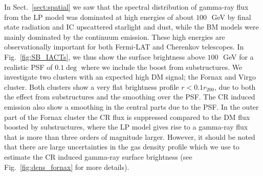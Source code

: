\documentclass[10pt,aps,pra,reprint,amsmath,amsfonts,amssymb,showpacs,nofootinbib,floatfix]{revtex4-1}
\newcommand{\rvir}{r_{200}}
\begin{document}
In Sect.~\ref{sect:spatial} we saw that the spectral distribution of
gamma-ray flux from the LP model was dominated at high energies of
about $100\,$~GeV by final state radiation and IC upscattered
starlight and dust, while the BM models were mainly dominated by the
continuum emission. These high energies are observationally important
for both Fermi-LAT and Cherenkov telescopes. In
Fig.~\ref{fig:SB_IACTs}, we thus show the surface brightness above
$100\,$~GeV for a realistic PSF of $0.1\deg$ where we include the
boost from substructures. We investigate two clusters with an expected
high DM signal; the Fornax and Virgo cluster. Both clusters show a
very flat brightness profile $r<0.1\rvir$, due to both the effect from
substructures and the smoothing over the PSF. The CR induced emission
also show a smoothing in the central parts due to the PSF. In the
outer part of the Fornax cluster the CR flux is suppressed compared to
the DM flux boosted by substructures, where the LP model gives rise to
a gamma-ray flux that is more than three orders of magnitude
larger. However, it should be noted that there are large uncertainties
in the gas density profile which we use to estimate the CR induced
gamma-ray surface brightness (see Fig.~\ref{fig:dens_fornax} for more
details).
\end{document}
